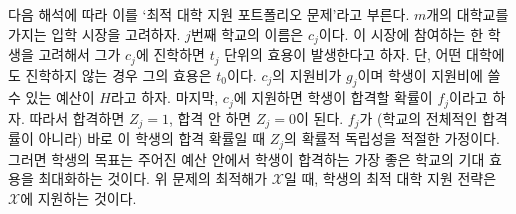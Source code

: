 \documentclass[12pt]{article} %
\newif\ifen
\theoremstyle{definition}
\theoremstyle{definition}
\begin{document}
\ifen
We refer to this problem as the \emph{optimal college application portfolio,} as follows: Consider a college market with $m$ colleges. The $j$th college is named $c_j$. Consider a single prospective student in this market, and let each $t_j$-value indicate the utility she associates with attending $c_j$, where her utility is $t_0$ if she does not attend college. Let $g_j$ denote the application fee for $c_j$ and $H$ the student's total budget to spend on application fees. Lastly, let $f_j$ denote the student's probability of being admitted to $c_j$ if she applies, so that $Z_j$ equals one if she is admitted and zero if not. It is appropriate to assume that the $Z_j$ are statistically independent as long as $f_j$ are probabilities estimated specifically for this student (as opposed to generic acceptance rates). Then the student's objective is to maximize the expected utility associated with the best school she gets into within this budget. Therefore, her optimal college application strategy is given by the solution $\mathcal{X}$ to the problem above, where $\mathcal{X}$ represents the set of schools to which she applies.
\else
다음 해석에 따라 이를 `최적 대학 지원 포트폴리오 문제'라고 부른다. $m$개의 대학교를 가지는 입학 시장을 고려하자. $j$번째 학교의 이름은 $c_j$이다. 이 시장에 참여하는 한 학생을 고려해서 그가 $c_j$에 진학하면 $t_j$ 단위의 효용이 발생한다고 하자. 단, 어떤 대학에도 진학하지 않는 경우 그의 효용은 $t_0$이다. $c_j$의 지원비가 $g_j$이며 학생이 지원비에 쓸 수 있는 예산이 $H$라고 하자. 마지막, $c_j$에 지원하면 학생이 합격할 확률이 $f_j$이라고 하자. 따라서 합격하면 $Z_j = 1$, 합격 안 하면 $Z_j = 0$이 된다. $f_j$가 (학교의 전체적인 합격률이 아니라) 바로 이 학생의 합격 확률일 때 $Z_j$의 확률적 독립성을 적절한 가정이다. 그러면 학생의 목표는 주어진 예산 안에서 학생이 합격하는 가장 좋은 학교의 기대 효용을 최대화하는 것이다. 위 문제의 최적해가 $\mathcal{X}$일 때, 학생의 최적 대학 지원 전략은 $\mathcal{X}$에 지원하는 것이다.
\fi
\end{document}
